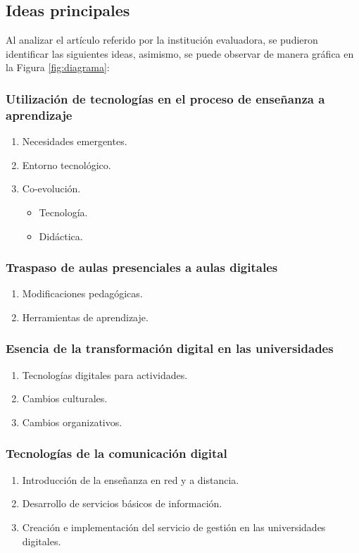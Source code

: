 \documentclass{article}
\begin{document}
\subsection{Ideas principales}
Al analizar el artículo referido por la institución evaluadora, se pudieron identificar las siguientes ideas, asimismo, se puede observar de manera gráfica en la Figura \ref{fig:diagrama}:
\subsubsection{Utilización de tecnologías en el proceso de enseñanza a aprendizaje}
\begin{enumerate}
    \item Necesidades emergentes.
    \item Entorno tecnológico.
    \item Co-evolución.
    \begin{itemize}
        \item Tecnología.
        \item Didáctica.
    \end{itemize}
\end{enumerate}
\subsubsection{Traspaso de aulas presenciales a aulas digitales}
\begin{enumerate}
    \item Modificaciones pedagógicas.
    \item Herramientas de aprendizaje.
\end{enumerate}
\subsubsection{Esencia de la transformación digital en las universidades}
\begin{enumerate}
    \item Tecnologías digitales para actividades.
    \item Cambios culturales.
    \item Cambios organizativos.
\end{enumerate}
\subsubsection{Tecnologías de la comunicación digital}
\begin{enumerate}
    \item Introducción de la enseñanza en red y a distancia.
    \item Desarrollo de servicios básicos de información.
    \item Creación e implementación del servicio de gestión en las universidades digitales.
\end{enumerate}
\end{document}
